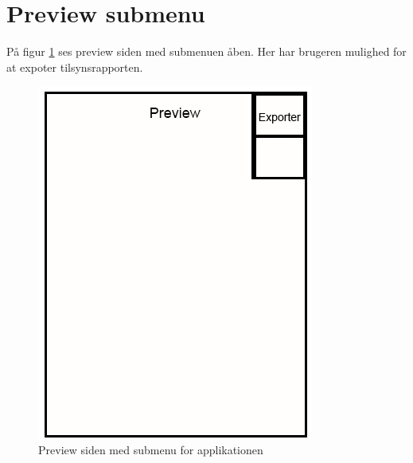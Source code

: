 \section{Preview submenu}\label{sec:PreviewSubMock}
På figur \ref{fig:PreviewSubMock} ses preview siden med submenuen åben. Her har brugeren mulighed for at expoter tilsynsrapporten.

\begin{figure}[H]
	\centering
	\includegraphics[width=0.4\linewidth]{MockUps/Mock/Ramboell-Preview-Sub}
	\caption{Preview siden med submenu for applikationen}
	\label{fig:PreviewSubMock}
\end{figure}
